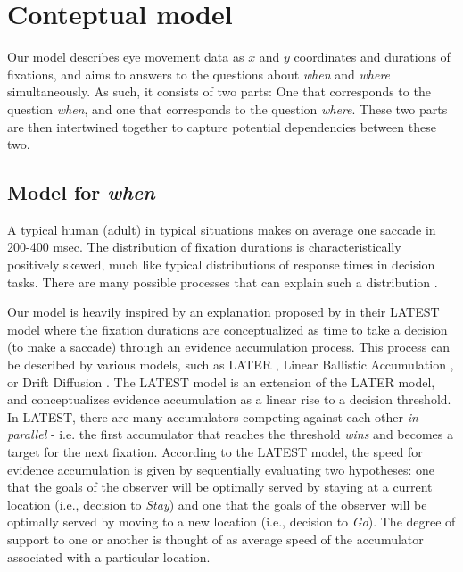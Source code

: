 \documentclass{article}
\begin{document}
\section{Conteptual model}

Our model describes eye movement data as $x$ and $y$ coordinates and durations of fixations, and aims to answers to the questions about \textit{when} and \textit{where} simultaneously. As such, it consists of two parts: One that corresponds to the question \textit{when}, and one that corresponds to the question \textit{where}. These two parts are then intertwined together to capture potential dependencies between these two.


\subsection{Model for \textit{when}}

A typical human (adult) in typical situations makes on average one saccade in 200-400 msec. The distribution of fixation durations is characteristically positively skewed, much like typical distributions of response times in decision tasks. There are many possible processes that can explain such a distribution \citep{palmer2011shapes}. 

Our model is heavily inspired by an explanation proposed by \citet{tatler2017latest} in their LATEST model where the fixation durations are conceptualized as time to take a decision (to make a saccade) through an evidence accumulation process. This process can be described by various models, such as LATER \citep{carpenter1995neural}, Linear Ballistic Accumulation \citep{brown2008simplest}, or Drift Diffusion \citep{ratcliff2008diffusion}. The LATEST model is an extension of the LATER model, and conceptualizes evidence accumulation as a linear rise to a decision threshold. In LATEST, there are many accumulators competing against each other \textit{in parallel} - i.e. the first accumulator that reaches the threshold \textit{wins} and becomes a target for the next fixation. According to the LATEST model, the speed for evidence accumulation is given by sequentially evaluating two hypotheses: one that the goals of the observer will be optimally served by staying at a current location (i.e., decision to \textit{Stay}) and one that the goals of the observer will be optimally served by moving to a new location (i.e., decision to \textit{Go}). The degree of support to one or another is thought of as average speed of the accumulator associated with a particular location.
\end{document}
